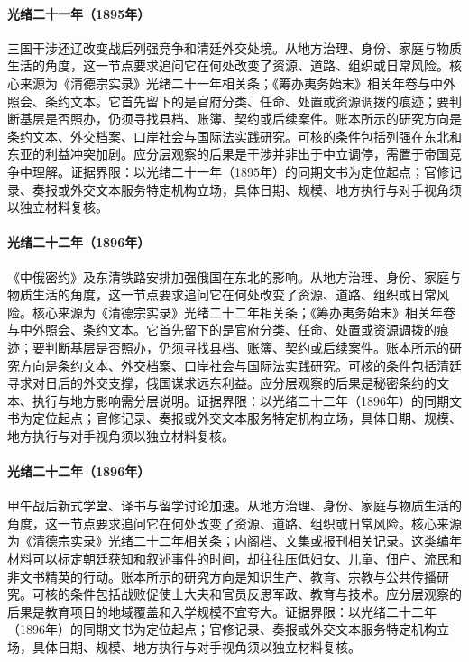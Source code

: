 \hypertarget{social:EQ-1895-TRIPLE-INTERVENTION}{}\paragraph{光绪二十一年（1895年）}三国干涉还辽改变战后列强竞争和清廷外交处境。从地方治理、身份、家庭与物质生活的角度，这一节点要求追问它在何处改变了资源、道路、组织或日常风险。核心来源为《清德宗实录》光绪二十一年相关条；《筹办夷务始末》相关年卷与中外照会、条约文本。它首先留下的是官府分类、任命、处置或资源调拨的痕迹；要判断基层是否照办，仍须寻找县档、账簿、契约或后续案件。账本所示的研究方向是条约文本、外交档案、口岸社会与国际法实践研究。可核的条件包括列强在东北和东亚的利益冲突加剧。应分层观察的后果是干涉并非出于中立调停，需置于帝国竞争中理解。证据界限：以光绪二十一年（1895年）的同期文书为定位起点；官修记录、奏报或外交文本服务特定机构立场，具体日期、规模、地方执行与对手视角须以独立材料复核。
\hypertarget{social:EQ-1896-LI-LOBANOV-TREATY}{}\paragraph{光绪二十二年（1896年）}《中俄密约》及东清铁路安排加强俄国在东北的影响。从地方治理、身份、家庭与物质生活的角度，这一节点要求追问它在何处改变了资源、道路、组织或日常风险。核心来源为《清德宗实录》光绪二十二年相关条；《筹办夷务始末》相关年卷与中外照会、条约文本。它首先留下的是官府分类、任命、处置或资源调拨的痕迹；要判断基层是否照办，仍须寻找县档、账簿、契约或后续案件。账本所示的研究方向是条约文本、外交档案、口岸社会与国际法实践研究。可核的条件包括清廷寻求对日后的外交支撑，俄国谋求远东利益。应分层观察的后果是秘密条约的文本、执行与地方影响需分层说明。证据界限：以光绪二十二年（1896年）的同期文书为定位起点；官修记录、奏报或外交文本服务特定机构立场，具体日期、规模、地方执行与对手视角须以独立材料复核。
\hypertarget{social:EQ-1896-MODERN-EDUCATION-EXPANSION}{}\paragraph{光绪二十二年（1896年）}甲午战后新式学堂、译书与留学讨论加速。从地方治理、身份、家庭与物质生活的角度，这一节点要求追问它在何处改变了资源、道路、组织或日常风险。核心来源为《清德宗实录》光绪二十二年相关条；内阁档、文集或报刊相关记录。这类编年材料可以标定朝廷获知和叙述事件的时间，却往往压低妇女、儿童、佃户、流民和非文书精英的行动。账本所示的研究方向是知识生产、教育、宗教与公共传播研究。可核的条件包括战败促使士大夫和官员反思军政、教育与技术。应分层观察的后果是教育项目的地域覆盖和入学规模不宜夸大。证据界限：以光绪二十二年（1896年）的同期文书为定位起点；官修记录、奏报或外交文本服务特定机构立场，具体日期、规模、地方执行与对手视角须以独立材料复核。
